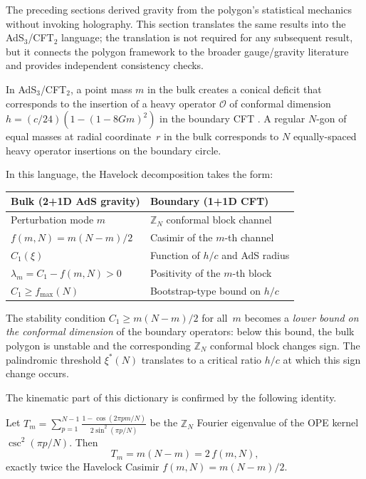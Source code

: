 The preceding sections derived gravity from the polygon's
statistical mechanics without invoking holography.
This section translates the same results into the
AdS$_3$/CFT$_2$ language; the translation is not required
for any subsequent result, but it connects the polygon
framework to the broader gauge/gravity literature and
provides independent consistency checks.

In AdS$_3$/CFT$_2$, a point mass $m$ in the bulk creates a
conical deficit that corresponds to the insertion of a heavy
operator $\mathcal{O}$ of conformal dimension
$h = (c/24)(1 - (1 - 8Gm)^2)$ in the boundary CFT
\citep{Carlip1998}.
A regular $N$-gon of equal masses at radial coordinate~$r$
in the bulk corresponds to $N$ equally-spaced heavy operator
insertions on the boundary circle.

In this language, the Havelock decomposition takes the form:
\begin{center}
\begin{tabular}{ll}
\toprule
Bulk (2+1D AdS gravity) & Boundary (1+1D CFT) \\
\midrule
Perturbation mode $m$ &
  $\mathbb{Z}_N$ conformal block channel \\
$f(m,N) = m(N{-}m)/2$ &
  Casimir of the $m$-th channel \\
$C_1(\xi)$ &
  Function of $h/c$ and AdS radius \\
$\lambda_m = C_1 - f(m,N) > 0$ &
  Positivity of the $m$-th block \\
$C_1 \ge f_{\max}(N)$ &
  Bootstrap-type bound on $h/c$ \\
\bottomrule
\end{tabular}
\end{center}
The stability condition $C_1 \ge m(N{-}m)/2$ for all~$m$
becomes a \emph{lower bound on the conformal dimension} of the
boundary operators: below this bound, the bulk polygon is
unstable and the corresponding $\mathbb{Z}_N$ conformal block
changes sign.
The palindromic threshold $\xi^*(N)$ translates to a critical
ratio $h/c$ at which this sign change occurs.

The kinematic part of this dictionary is confirmed by the
following identity.

\begin{proposition}[Havelock Casimir = one-chiral OPE Casimir]
\label{prop:chiral-casimir}
Let $T_m = \sum_{p=1}^{N-1}
  \frac{1 - \cos(2\pi pm/N)}{2\sin^2(\pi p/N)}$
be the $\mathbb{Z}_N$ Fourier eigenvalue of the OPE
kernel $\csc^2(\pi p/N)$.  Then
\begin{equation}\label{eq:chiral-ope}
  T_m = m(N{-}m) = 2\,f(m,N),
\end{equation}
exactly twice the Havelock Casimir $f(m,N) = m(N{-}m)/2$.
\end{proposition}

